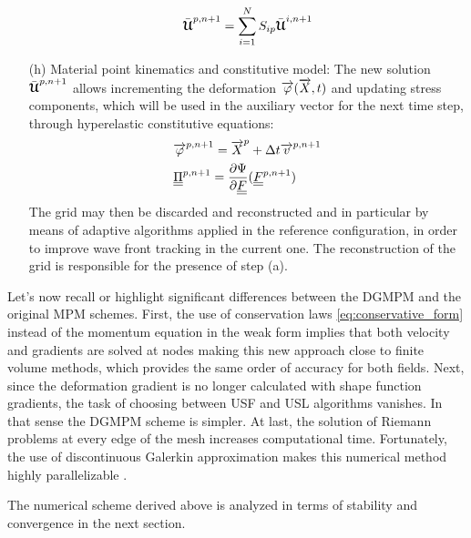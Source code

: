\begin{itemize}
  \begin{equation}
    \bar{{\boldsymbol{\mathcal{U}}}}^{p,n+1} = \sum_{i=1}^{N} S_{ip}\bar{{\boldsymbol{\mathcal{U}}}}^{i,n+1}
  \end{equation}
\item[(h)] Material point kinematics and constitutive model: The new solution $\bar{{\boldsymbol{\mathcal{U}}}}^{p,n+1}$ allows incrementing the deformation ${\overrightarrow{\varphi}}({\overrightarrow{X}},t)$ and updating stress components, which will be used in the auxiliary vector for the next time step, through hyperelastic constitutive equations:
  \begin{align}
    & {\overrightarrow{\varphi}}^{p,n+1} = {\overrightarrow{X}}^p + \Delta t {\overrightarrow{v}}^{p,n+1} \\
    & {\underline{\underline{\Pi}}}^{p,n+1} =  \frac{\partial \Psi}{\partial {\underline{\underline{F}}}}({\underline{\underline{F}}}^{p,n+1})
  \end{align}
  The grid may then be discarded and reconstructed and in particular by means of adaptive algorithms applied in the reference configuration, in order to improve wave front tracking in the current one.
  The reconstruction of the grid is responsible for the presence of step (a).
\end{itemize}

Let's now recall or highlight significant differences between the DGMPM and the original MPM schemes. 
First, the use of conservation laws \eqref{eq:conservative_form} instead of the momentum equation in the weak form implies that both velocity and gradients are solved at nodes making this new approach close to finite volume methods, which provides the same order of accuracy for both fields. 
Next, since the deformation gradient is no longer calculated with shape function gradients, the task of choosing between USF and USL algorithms vanishes. In that sense the DGMPM scheme is simpler.
At last, the solution of Riemann problems at every edge of the mesh increases computational time. Fortunately, the use of discontinuous Galerkin approximation makes this numerical method highly parallelizable \cite{Cockburn}.

The numerical scheme derived above is analyzed in terms of stability and convergence in the next section.


